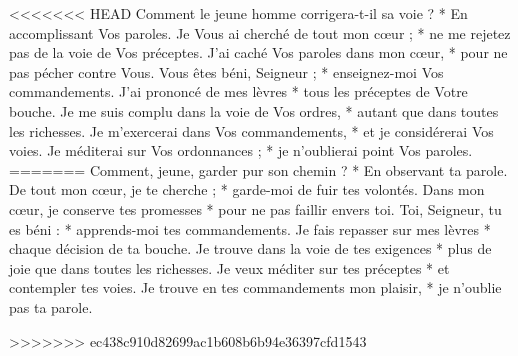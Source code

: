 <<<<<<< HEAD
Comment le jeune homme corrigera-t-il sa voie ? * En accomplissant Vos paroles.
\versseparator
Je Vous ai cherché de tout mon cœur ; * ne me rejetez pas de la voie de Vos préceptes.
\versseparator
J'ai caché Vos paroles dans mon cœur, * pour ne pas pécher contre Vous.
\versseparator
Vous êtes béni, Seigneur ; * enseignez-moi Vos commandements.
\versseparator
J'ai prononcé de mes lèvres * tous les préceptes de Votre bouche.
\versseparator
Je me suis complu dans la voie de Vos ordres, * autant que dans toutes les richesses.
\versseparator
Je m'exercerai dans Vos commandements, * et je considérerai Vos voies.
\versseparator
Je méditerai sur Vos ordonnances ; * je n'oublierai point Vos paroles.
=======
Comment, jeune, garder pur son chemin ? *
En observant ta parole.
\versseparator
De tout mon cœur, je te cherche ; *
garde-moi de fuir tes volontés.
\versseparator
Dans mon cœur, je conserve tes promesses *
pour ne pas faillir envers toi.
\versseparator
Toi, Seigneur, tu es béni : *
apprends-moi tes commandements.
\versseparator
Je fais repasser sur mes lèvres *
chaque décision de ta bouche.
\versseparator
Je trouve dans la voie de tes exigences *
plus de joie que dans toutes les richesses.
\versseparator
Je veux méditer sur tes préceptes *
et contempler tes voies.
\versseparator
Je trouve en tes commandements mon plaisir, *
je n’oublie pas ta parole.

>>>>>>> ec438c910d82699ac1b608b6b94e36397cfd1543
